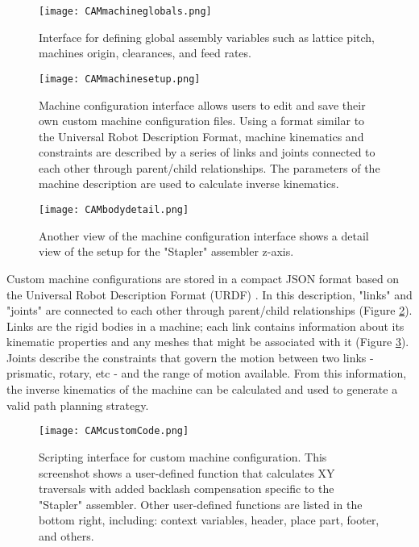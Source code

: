 {\begin{figure}
  \texttt{[image: CAMmachineglobals.png]}
  \caption{Interface for defining global assembly variables such as lattice pitch, machines origin, clearances, and feed rates.}
  \label{fig:CAMmachineglobals}
\end{figure}

\begin{figure}
  \texttt{[image: CAMmachinesetup.png]}
  \caption{Machine configuration interface allows users to edit and save their own custom machine configuration files.  Using a format similar to the Universal Robot Description Format, machine kinematics and constraints are described by a series of links and joints connected to each other through parent/child relationships.  The parameters of the machine description are used to calculate inverse kinematics.}
  \label{fig:CAMmachinesetup}
\end{figure}

\begin{figure}
  \texttt{[image: CAMbodydetail.png]}
  \caption{Another view of the machine configuration interface shows a detail view of the setup for the "Stapler" assembler z-axis.}
  \label{fig:CAMbodydetail}
\end{figure}

Custom machine configurations are stored in a compact JSON format based on the Universal Robot Description Format (URDF) \cite{ROS2016}.  In this description, "links" and "joints" are connected to each other through parent/child relationships (Figure \ref{fig:CAMmachinesetup}).  Links are the rigid bodies in a machine; each link contains information about its kinematic properties and any meshes that might be associated with it (Figure \ref{fig:CAMbodydetail}).  Joints describe the constraints that govern the motion between two links - prismatic, rotary, etc - and the range of motion available.  From this information, the inverse kinematics of the machine can be calculated and used to generate a valid path planning strategy.\\

\begin{figure}
  \texttt{[image: CAMcustomCode.png]}
  \caption{Scripting interface for custom machine configuration.  This screenshot shows a user-defined function that calculates XY traversals with added backlash compensation specific to the "Stapler" assembler.  Other user-defined functions are listed in the bottom right, including: context variables, header, place part, footer, and others.}
  \label{fig:CAMcustomCode}
\end{figure}

}
